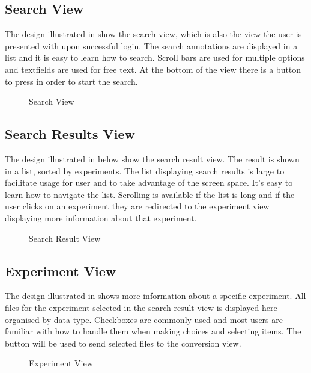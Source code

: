 \subsection{Search View}
The design illustrated in  show the search view, which is also the view the user is presented with upon successful login. The search annotations are displayed in a list and it is easy to learn how to search. Scroll bars are used for multiple options and textfields are used for free text. At the bottom of the view there is a button to press in order to start the search.

\begin{figure}[ht]
\caption{Search View}
\label{fig:and_search}
\end{figure}
\FloatBarrier

\subsection{Search Results View}
The design illustrated in  below show the search result view. The result is shown in a list, sorted by experiments. The list displaying search results is large to facilitate usage for user and to take advantage of the screen space. It's easy to learn how to navigate the list. Scrolling is available if the list is long and if the user clicks on an experiment they are redirected to the experiment view displaying more information about that experiment.

\begin{figure}[ht]
\caption{Search Result View}
\label{fig:and_result}
\end{figure}
\FloatBarrier

\subsection{Experiment View}
The design illustrated in  shows more information about a specific experiment. All files for the experiment selected in the search result view is displayed here organised by data type. Checkboxes are commonly used and most users are familiar with how to handle them when making choices and selecting items. The button  will be used to send selected files to the conversion view.

\begin{figure}[ht]
\caption{Experiment View}
\label{fig:and_experiment}
\end{figure}
\FloatBarrier

